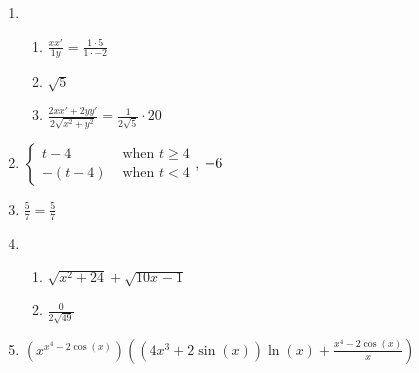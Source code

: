 \documentclass[12pt,twoside]{article}
\makeatletter
\def\emptycleardoublepage{\clearpage\if@twoside \ifodd\c@page\else
\thispagestyle{empty}%
\hbox{}\newpage\if@twocolumn\hbox{}\newpage\fi\fi\fi}
\makeatother
\begin{document}
\begin{multicols}{2}
\begin{enumerate}
\def \b{1}\def \x{1}\def \y{-2}\def \xchange{5}\def \ratrhs{-2}\def \cirrhs{5}\def \hyprhs{-3}\def \compy{y^{2}}\def \ychangenum{-10}\def \dist{5}\def \fracrat{-30}\def \fraccirc{0}\def \frachyp{20}
\item \begin{enumerate}
\item $\frac{xx'}{\b y} = \frac{\x \cdot \xchange}{\b \cdot \y}$
\item $\sqrt{\dist}$
\item $\frac{2xx'+2yy'}{2\sqrt{x^2+y^2}} = \frac{1}{2\sqrt{\dist}} \cdot \frachyp$
\end{enumerate}
\def \a{4}\def \k{6}\def \abstop{0}\def \ktop{1}
\item $\begin{cases} t-\a & \text{ when } t \geq \a \\ -(t- \a) & \text{ when } t < \a \end{cases}$, $\ifthenelse{\ktop=1}{-\k}{-\frac{1}{\k}}$
\def \a{3}\def \b{-4}\def \k{5}\def \fancyp{x^{2}+x^{}-12}\def \simplep{5x^{}-15}\def \fancyreduced{7}\def \niceanstop{\frac{7}{5}}\def \niceansbottom{\frac{5}{7}}
\item $\frac{\k}{\fancyreduced} = \niceansbottom$
\def \a{5}\def \b{5}\def \ab{25}\def \c{24}\def \amb{0}\def \ansroot{49}\def \firstroot{x^{2}+24}\def \secondroot{10x^{}-1}\def \porm{1}
\item \begin{enumerate}
\item $\sqrt{\firstroot} + \sqrt{\secondroot}$
\item $\frac{\amb}{2\sqrt{\ansroot}}$
\end{enumerate}
\def \varexp{4}\def \newexp{3}\def \trigcoeff{-2}\def \trigval{-2}\def \oppval{+2}
\item $(x^{x^\varexp \trigval \cos(x)}) \left( (\varexp x^{\newexp} \oppval \sin(x))\ln(x) + \frac{x^\varexp \trigval \cos(x)}{x} \right)$
 \end{enumerate}\end{multicols}\emptycleardoublepage{}\graphicspath{{C:/Users/iainc/anaconda3/Randomizer/MATH 1001/Midterm 1/}}\begin{multicols}{2} \begin{enumerate}\def \a{6}\def \b{9}\def \c{-5}\def \d{3}\def \negb{-9}\def \negc{5}\def \determ{63}\def \ansa{\frac{1}{21}}\def \ansb{\frac{-1}{7}}\def \ansc{\frac{5}{63}}\def \ansd{\frac{2}{21}}

\end{enumerate}
\end{multicols}
\end{document}
